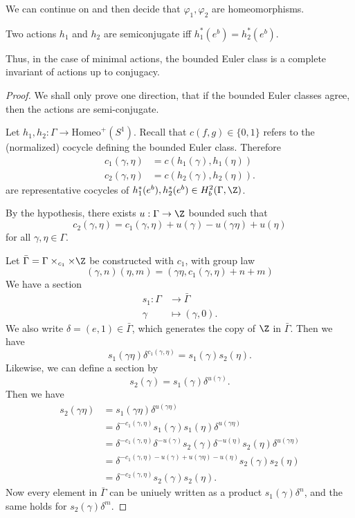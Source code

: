 \documentclass[a4paper]{article}
\newcommand\Homeo{\mathrm{Homeo}}
\begin{document}
We can continue on and then decide that $\varphi_1, \varphi_2$ are homeomorphisms.

\begin{thm}[F. Ghys, 1984]
  Two actions $h_1$ and $h_2$ are semiconjugate iff $h_1^*(e^b) = h_2^*(e^b)$.
\end{thm}
Thus, in the case of minimal actions, the bounded Euler class is a complete invariant of actions up to conjugacy.

\begin{proof}
  We shall only prove one direction, that if the bounded Euler classes agree, then the actions are semi-conjugate.

  Let $h_1, h_2: \Gamma \to \Homeo^+(S^1)$. Recall that $c(f, g) \in \{0, 1\}$ refers to the (normalized) cocycle defining the bounded Euler class. Therefore
  \begin{align*}
    c_1(\gamma, \eta) &= c(h_1(\gamma), h_1(\eta))\\
    c_2(\gamma, \eta) &= c(h_2(\gamma), h_2(\eta)).
  \end{align*}
  are representative cocycles of $h_1^*(e^b), h_2^*(e^b) \in H_b^2(\Gamma, \Z)$.

  By the hypothesis, there exists $u: \Gamma \to \Z$ bounded such that
  \[
    c_2(\gamma, \eta) = c_1(\gamma, \eta) + u(\gamma) - u(\gamma\eta) + u(\eta)
  \]
  for all $\gamma, \eta \in \Gamma$.

  Let $\bar{\Gamma} = \Gamma \times_{c_1} \times \Z$ be constructed with $c_1$, with group law
  \[
    (\gamma, n)(\eta, m) = (\gamma \eta, c_1(\gamma, \eta) + n + m)
  \]
  We have a section
  \begin{align*}
    s_1: \Gamma &\to \bar{\Gamma} \\
    \gamma &\mapsto (\gamma, 0).
  \end{align*}
  We also write $\delta = (e, 1) \in \bar{\Gamma}$, which generates the copy of $\Z$ in $\bar{\Gamma}$. Then we have
  \[
    s_1(\gamma \eta) \delta^{c_1(\gamma, \eta)} = s_1(\gamma) s_2(\eta).
  \]
  Likewise, we can define a section by
  \[
    s_2(\gamma) = s_1(\gamma) \delta^{u(\gamma)}.
  \]
  Then we have
  \begin{align*}
    s_2(\gamma \eta) &= s_1 (\gamma \eta) \delta^{u(\gamma \eta)} \\
    &= \delta^{-c_1(\gamma, \eta)} s_1(\gamma) s_1 (\eta) \delta^{u(\gamma \eta)}\\
    &= \delta^{-c_1(\gamma, \eta)} \delta^{-u(\gamma)} s_2(\gamma) \delta^{-u(\eta)} s_2 (\eta) \delta^{u(\gamma \eta)}\\
    &= \delta^{-c_1(\gamma, \eta) - u(\gamma) + u(\gamma \eta) - u(\eta)} s_2 (\gamma) s_2(\eta)\\
    &= \delta^{-c_2(\gamma, \eta)} s_2(\gamma) s_2(\eta).
  \end{align*}
  Now every element in $\bar{\Gamma}$ can be uniuely written as a product $s_1(\gamma) \delta^n$, and the same holds for $s_2(\gamma) \delta^m$.


\end{proof}
\end{document}
